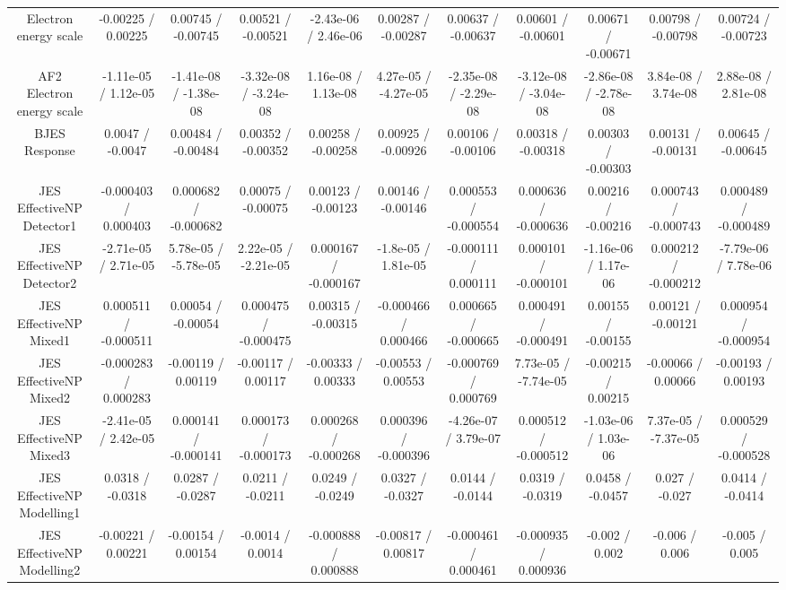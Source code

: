 \begin{table}[htbp]
\begin{center}
\begin{tabular}{|c|c|c|c|c|c|c|c|c|c|c|}
  Electron energy scale & -0.00225 / 0.00225 & 0.00745 / -0.00745 & 0.00521 / -0.00521 & -2.43e-06 / 2.46e-06 & 0.00287 / -0.00287 & 0.00637 / -0.00637 & 0.00601 / -0.00601 & 0.00671 / -0.00671 & 0.00798 / -0.00798 & 0.00724 / -0.00723 \\ 
  AF2 Electron energy scale & -1.11e-05 / 1.12e-05 & -1.41e-08 / -1.38e-08 & -3.32e-08 / -3.24e-08 & 1.16e-08 / 1.13e-08 & 4.27e-05 / -4.27e-05 & -2.35e-08 / -2.29e-08 & -3.12e-08 / -3.04e-08 & -2.86e-08 / -2.78e-08 & 3.84e-08 / 3.74e-08 & 2.88e-08 / 2.81e-08 \\ 
  BJES Response & 0.0047 / -0.0047 & 0.00484 / -0.00484 & 0.00352 / -0.00352 & 0.00258 / -0.00258 & 0.00925 / -0.00926 & 0.00106 / -0.00106 & 0.00318 / -0.00318 & 0.00303 / -0.00303 & 0.00131 / -0.00131 & 0.00645 / -0.00645 \\ 
  JES EffectiveNP Detector1 & -0.000403 / 0.000403 & 0.000682 / -0.000682 & 0.00075 / -0.00075 & 0.00123 / -0.00123 & 0.00146 / -0.00146 & 0.000553 / -0.000554 & 0.000636 / -0.000636 & 0.00216 / -0.00216 & 0.000743 / -0.000743 & 0.000489 / -0.000489 \\ 
  JES EffectiveNP Detector2 & -2.71e-05 / 2.71e-05 & 5.78e-05 / -5.78e-05 & 2.22e-05 / -2.21e-05 & 0.000167 / -0.000167 & -1.8e-05 / 1.81e-05 & -0.000111 / 0.000111 & 0.000101 / -0.000101 & -1.16e-06 / 1.17e-06 & 0.000212 / -0.000212 & -7.79e-06 / 7.78e-06 \\ 
  JES EffectiveNP Mixed1 & 0.000511 / -0.000511 & 0.00054 / -0.00054 & 0.000475 / -0.000475 & 0.00315 / -0.00315 & -0.000466 / 0.000466 & 0.000665 / -0.000665 & 0.000491 / -0.000491 & 0.00155 / -0.00155 & 0.00121 / -0.00121 & 0.000954 / -0.000954 \\ 
  JES EffectiveNP Mixed2 & -0.000283 / 0.000283 & -0.00119 / 0.00119 & -0.00117 / 0.00117 & -0.00333 / 0.00333 & -0.00553 / 0.00553 & -0.000769 / 0.000769 & 7.73e-05 / -7.74e-05 & -0.00215 / 0.00215 & -0.00066 / 0.00066 & -0.00193 / 0.00193 \\ 
  JES EffectiveNP Mixed3 & -2.41e-05 / 2.42e-05 & 0.000141 / -0.000141 & 0.000173 / -0.000173 & 0.000268 / -0.000268 & 0.000396 / -0.000396 & -4.26e-07 / 3.79e-07 & 0.000512 / -0.000512 & -1.03e-06 / 1.03e-06 & 7.37e-05 / -7.37e-05 & 0.000529 / -0.000528 \\ 
  JES EffectiveNP Modelling1 & 0.0318 / -0.0318 & 0.0287 / -0.0287 & 0.0211 / -0.0211 & 0.0249 / -0.0249 & 0.0327 / -0.0327 & 0.0144 / -0.0144 & 0.0319 / -0.0319 & 0.0458 / -0.0457 & 0.027 / -0.027 & 0.0414 / -0.0414 \\ 
  JES EffectiveNP Modelling2 & -0.00221 / 0.00221 & -0.00154 / 0.00154 & -0.0014 / 0.0014 & -0.000888 / 0.000888 & -0.00817 / 0.00817 & -0.000461 / 0.000461 & -0.000935 / 0.000936 & -0.002 / 0.002 & -0.006 / 0.006 & -0.005 / 0.005 \\ 

\end{tabular}
\end{center}
\end{table}
